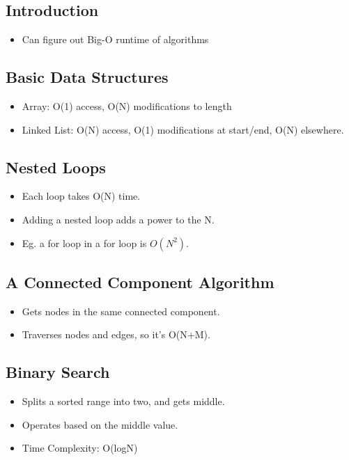 \subsection{Introduction}
\begin{itemize}
    \item Can figure out Big-O runtime of algorithms
\end{itemize}

\subsection{Basic Data Structures}
\begin{itemize}
    \item Array: O(1) access, O(N) modifications to length
    \item Linked List: O(N) access, O(1) modifications at start/end, O(N) elsewhere.
\end{itemize}

\subsection{Nested Loops}
\begin{itemize}
    \item Each loop takes O(N) time.
    \item Adding a nested loop adds a power to the N.
    \item Eg. a for loop in a for loop is $O(N^2)$.
\end{itemize}

\subsection{A Connected Component Algorithm}
\begin{itemize}
    \item Gets nodes in the same connected component.
    \item Traverses nodes and edges, so it's O(N+M).
\end{itemize}

\subsection{Binary Search}
\begin{itemize}
    \item Splits a sorted range into two, and gets middle.
    \item Operates based on the middle value.
    \item Time Complexity: O(logN)
\end{itemize}

